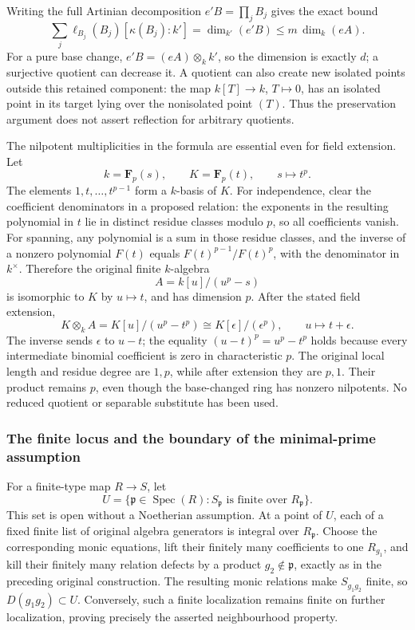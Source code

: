Writing the full Artinian decomposition \(e'B=\prod_j B_j\) gives the exact bound \[
 \sum_j\ell_{B_j}(B_j)[\kappa(B_j):k']
       =\dim_{k'}(e'B)\le m\,\dim_k(eA).
\] For a pure base change, \(e'B=(eA)\otimes_k k'\), so the dimension is exactly \(d\); a surjective quotient can decrease it. A quotient can also create new isolated points outside this retained component: the map \(k[T]\to k\), \(T\mapsto0\), has an isolated point in its target lying over the nonisolated point \((T)\). Thus the preservation argument does not assert reflection for arbitrary quotients.

The nilpotent multiplicities in the formula are essential even for field extension. Let \[
 k=\mathbf F_p(s),\qquad K=\mathbf F_p(t),
 \qquad s\longmapsto t^p.
\] The elements \(1,t,\ldots,t^{p-1}\) form a \(k\)-basis of \(K\). For independence, clear the coefficient denominators in a proposed relation: the exponents in the resulting polynomial in \(t\) lie in distinct residue classes modulo \(p\), so all coefficients vanish. For spanning, any polynomial is a sum in those residue classes, and the inverse of a nonzero polynomial \(F(t)\) equals \(F(t)^{p-1}/F(t)^p\), with the denominator in \(k^\times\). Therefore the original finite \(k\)-algebra \[
 A=k[u]/(u^p-s)
\] is isomorphic to \(K\) by \(u\mapsto t\), and has dimension \(p\). After the stated field extension, \[
 K\otimes_k A
 =K[u]/(u^p-t^p)
 \cong K[\epsilon]/(\epsilon^p),\qquad u\longmapsto t+\epsilon.
\] The inverse sends \(\epsilon\) to \(u-t\); the equality \((u-t)^p=u^p-t^p\) holds because every intermediate binomial coefficient is zero in characteristic \(p\). The original local length and residue degree are \(1,p\), while after extension they are \(p,1\). Their product remains \(p\), even though the base-changed ring has nonzero nilpotents. No reduced quotient or separable substitute has been used.

\subsubsection{The finite locus and the boundary of the minimal-prime assumption}\label{algebra-proof-031-the-finite-locus-and-the-boundary-of-the-minimal-prime-assumption}

For a finite-type map \(R\to S\), let \[
 U=\{\mathfrak p\in\operatorname{Spec}(R):
                     S_{\mathfrak p}\text{ is finite over }R_{\mathfrak p}\}.
\] This set is open without a Noetherian assumption. At a point of \(U\), each of a fixed finite list of original algebra generators is integral over \(R_{\mathfrak p}\). Choose the corresponding monic equations, lift their finitely many coefficients to one \(R_{g_1}\), and kill their finitely many relation defects by a product \(g_2\notin\mathfrak p\), exactly as in the preceding original construction. The resulting monic relations make \(S_{g_1g_2}\) finite, so \(D(g_1g_2)\subset U\). Conversely, such a finite localization remains finite on further localization, proving precisely the asserted neighbourhood property.

